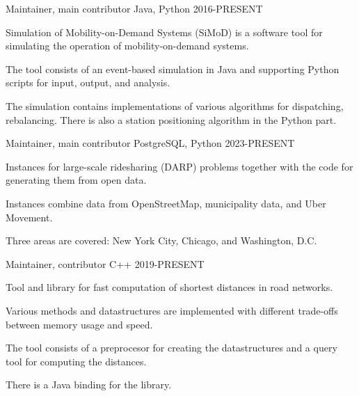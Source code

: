 

\begin{cventries}

  \cventry
    {Maintainer, main contributor} %
    {} %
    {Java, Python} %
    {2016-PRESENT} %
    {
      \begin{cvitems} %
        \item {Simulation of Mobility-on-Demand Systems (SiMoD) is a software tool for simulating the operation of mobility-on-demand systems.}
        \item {The tool consists of an event-based simulation in Java and supporting Python scripts for input, output, and analysis.}
        \item {The simulation contains implementations of various algorithms for dispatching, rebalancing. There is also a station positioning algorithm in the Python part.}
      \end{cvitems}
    }

\cventry
{Maintainer, main contributor} %
{} %
{PostgreSQL, Python} %
{2023-PRESENT} %
{
  \begin{cvitems} %
    \item {Instances for large-scale ridesharing (DARP) problems together with the code for generating them from open data.}
    \item {Instances combine data from OpenStreetMap, municipality data, and Uber Movement.}
    \item {Three areas are covered: New York City, Chicago, and Washington, D.C.}
  \end{cvitems}
}    

\cventry
{Maintainer, contributor} %
{} %
{C++} %
{2019-PRESENT} %
{
  \begin{cvitems} %
    \item {Tool and library for fast computation of shortest distances in road networks.}
    \item {Various methods and datastructures are implemented with different trade-offs between memory usage and speed.}
    \item {The tool consists of a preprocesor for creating the datastructures and a query tool for computing the distances.}
    \item {There is a Java binding for the library.}
  \end{cvitems}
}   


\end{cventries}
